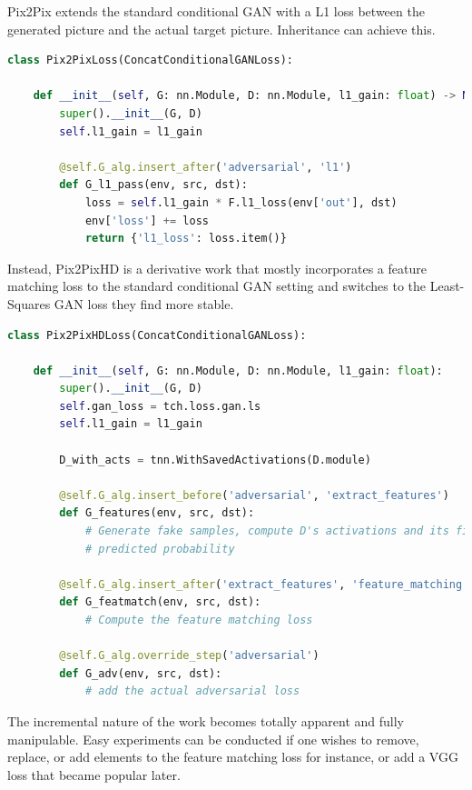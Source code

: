 Pix2Pix extends the standard conditional GAN with a L1 loss between the generated picture and the actual target picture. Inheritance can achieve this.

\begin{lstlisting}[language=Python, caption=Pix2Pix from ConcatConditionalGAN]
class Pix2PixLoss(ConcatConditionalGANLoss):

    def __init__(self, G: nn.Module, D: nn.Module, l1_gain: float) -> None:
        super().__init__(G, D)
        self.l1_gain = l1_gain

        @self.G_alg.insert_after('adversarial', 'l1')
        def G_l1_pass(env, src, dst):
            loss = self.l1_gain * F.l1_loss(env['out'], dst)
            env['loss'] += loss
            return {'l1_loss': loss.item()}
\end{lstlisting}

Instead, Pix2PixHD is a derivative work that mostly incorporates a feature matching loss to the standard conditional GAN setting and switches to the Least-Squares GAN loss they find more stable.

\begin{lstlisting}[language=Python, caption=Pix2PixHD]
class Pix2PixHDLoss(ConcatConditionalGANLoss):

    def __init__(self, G: nn.Module, D: nn.Module, l1_gain: float):
        super().__init__(G, D)
        self.gan_loss = tch.loss.gan.ls
        self.l1_gain = l1_gain

        D_with_acts = tnn.WithSavedActivations(D.module)

        @self.G_alg.insert_before('adversarial', 'extract_features')
        def G_features(env, src, dst):
            # Generate fake samples, compute D's activations and its final
            # predicted probability

        @self.G_alg.insert_after('extract_features', 'feature_matching')
        def G_featmatch(env, src, dst):
            # Compute the feature matching loss

        @self.G_alg.override_step('adversarial')
        def G_adv(env, src, dst):
            # add the actual adversarial loss
\end{lstlisting}

The incremental nature of the work becomes totally apparent and fully manipulable. Easy experiments can be conducted if one wishes to remove, replace, or add elements to the feature matching loss for instance, or add a VGG loss that became popular later.

